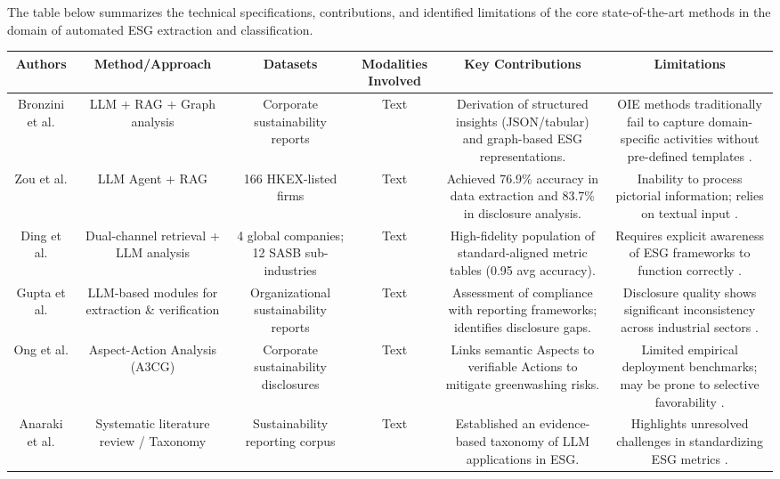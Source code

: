 \documentclass{article}
\begin{document}
The table below summarizes the technical specifications, contributions, and identified limitations of the core state-of-the-art methods in the domain of automated ESG extraction and classification.
\begin{table}[h!]
\centering
\begin{tabular}{|c|c|c|c|c|c|}
\hline
Authors & Method/Approach & Datasets & Modalities Involved & Key Contributions & Limitations \\ \hline
Bronzini et al.  \parencite{marco_bronzini_bf94d949} & LLM + RAG + Graph analysis & Corporate sustainability reports & Text & Derivation of structured insights (JSON/tabular) and graph-based ESG representations. & OIE methods traditionally fail to capture domain-specific activities without pre-defined templates  \parencite{marco_bronzini_bf94d949}. \\ \hline
Zou et al.  \parencite{yi_zou_37c055f7} & LLM Agent + RAG & 166 HKEX-listed firms & Text & Achieved 76.9\% accuracy in data extraction and 83.7\% in disclosure analysis. & Inability to process pictorial information; relies on textual input  \parencite{yi_zou_37c055f7}. \\ \hline
Ding et al.  \parencite{yi_ding_136f177b} & Dual-channel retrieval + LLM analysis & 4 global companies; 12 SASB sub-industries & Text & High-fidelity population of standard-aligned metric tables (0.95 avg accuracy). & Requires explicit awareness of ESG frameworks to function correctly  \parencite{yi_ding_136f177b}. \\ \hline
Gupta et al.  \parencite{tanay_gupta_b5c91517} & LLM-based modules for extraction \& verification & Organizational sustainability reports & Text & Assessment of compliance with reporting frameworks; identifies disclosure gaps. & Disclosure quality shows significant inconsistency across industrial sectors  \parencite{tanay_gupta_b5c91517}. \\ \hline
Ong et al.  \parencite{keane_ong_369a0b63} & Aspect-Action Analysis (A3CG) & Corporate sustainability disclosures & Text & Links semantic Aspects to verifiable Actions to mitigate greenwashing risks. & Limited empirical deployment benchmarks; may be prone to selective favorability  \parencite{keane_ong_369a0b63}. \\ \hline
Anaraki et al.  \parencite{seyed_alireza_mousavian_anaraki_b56a1c0f} & Systematic literature review / Taxonomy & Sustainability reporting corpus & Text & Established an evidence-based taxonomy of LLM applications in ESG. & Highlights unresolved challenges in standardizing ESG metrics  \parencite{seyed_alireza_mousavian_anaraki_b56a1c0f}. \\ \hline

\end{tabular}
\end{table}
\end{document}
